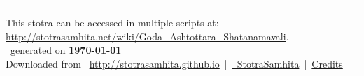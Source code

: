 \documentclass[oneside,12pt]{book}
\begin{document}
\setmainfont[Script=Devanagari,Mapping=tex-text]{Sanskrit 2003}
\fontsize {16}{19.25}\selectfont
\begin{center}

\end{center}
\vfill
\centering
\rule{0.8\textwidth}{0.6pt}

\footnotesize
{}\sffamily
This stotra can be accessed in multiple scripts at:\\
\url{http://stotrasamhita.net/wiki/Goda_Ashtottara_Shatanamavali}.\\[1ex]
\faFilePdfO~generated on \textbf{\today}\\[1ex]
Downloaded from \faGlobe{}~\url{http://stotrasamhita.github.io}~|~\href{https://github.com/StotraSamhita}{\faGithubSquare{}~StotraSamhita}~|~\href{https://stotrasamhita.github.io/about/}{Credits}
\end{document}
